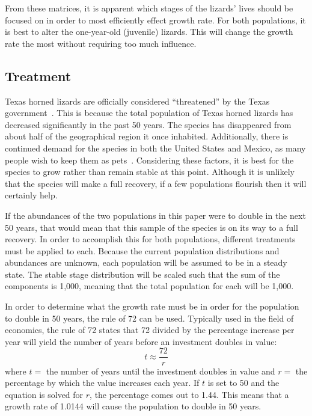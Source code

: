 \documentclass{article}
\begin{document}
    From these matrices, it is apparent which stages of the lizards' lives should be focused on in order to most efficiently effect growth rate.
    For both populations, it is best to alter the one-year-old (juvenile) lizards.
    This will change the growth rate the most without requiring too much influence.

    \subsection{Treatment}\label{subsec:treatment}

    Texas horned lizards are officially considered ``threatened'' by the Texas government~\cite{noauthor_texas_nodate}.
    This is because the total population of Texas horned lizards has decreased significantly in the past 50 years.
    The species has disappeared from about half of the geographical region it once inhabited.
    Additionally, there is continued demand for the species in both the United States and Mexico, as many people wish to keep them as pets~\cite{pianka_horned_nodate}.
    Considering these factors, it is best for the species to grow rather than remain stable at this point.
    Although it is unlikely that the species will make a full recovery, if a few populations flourish then it will certainly help.

    If the abundances of the two populations in this paper were to double in the next 50 years, that would mean that this sample of the species is on its way to a full recovery.
    In order to accomplish this for both populations, different treatments must be applied to each.
    Because the current population distributions and abundances are unknown, each population will be assumed to be in a steady state.
    The stable stage distribution will be scaled such that the sum of the components is 1,000, meaning that the total population for each will be 1,000.

    In order to determine what the growth rate must be in order for the population to double in 50 years, the rule of 72 can be used.
    Typically used in the field of economics, the rule of 72 states that 72 divided by the percentage increase per year will yield the number of years before an investment doubles in value:
    \begin{equation}
        t \approx \frac{72}{r}
    \end{equation}
    where $t =$ the number of years until the investment doubles in value and $r =$ the percentage by which the value increases each year.
    If $t$ is set to 50 and the equation is solved for $r$, the percentage comes out to 1.44.
    This means that a growth rate of 1.0144 will cause the population to double in 50 years.
\end{document}
